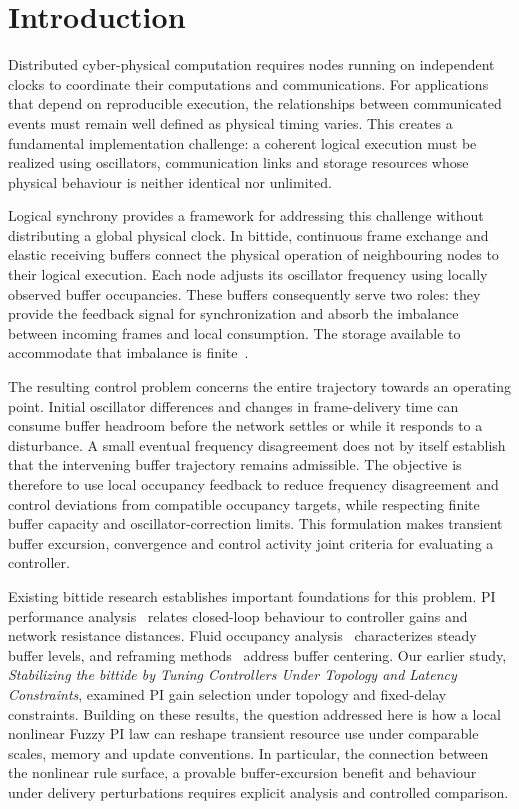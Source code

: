 \section{Introduction}
\label{sec:introduction}

Distributed cyber-physical computation requires nodes running on independent clocks to coordinate their computations and communications. For applications that depend on reproducible execution, the relationships between communicated events must remain well defined as physical timing varies. This creates a fundamental implementation challenge: a coherent logical execution must be realized using oscillators, communication links and storage resources whose physical behaviour is neither identical nor unlimited.

Logical synchrony provides a framework for addressing this challenge without distributing a global physical clock. In bittide, continuous frame exchange and elastic receiving buffers connect the physical operation of neighbouring nodes to their logical execution. Each node adjusts its oscillator frequency using locally observed buffer occupancies. These buffers consequently serve two roles: they provide the feedback signal for synchronization and absorb the imbalance between incoming frames and local consumption. The storage available to accommodate that imbalance is finite~\cite{lall2024logicalSynchrony}.

The resulting control problem concerns the entire trajectory towards an operating point. Initial oscillator differences and changes in frame-delivery time can consume buffer headroom before the network settles or while it responds to a disturbance. A small eventual frequency disagreement does not by itself establish that the intervening buffer trajectory remains admissible. The objective is therefore to use local occupancy feedback to reduce frequency disagreement and control deviations from compatible occupancy targets, while respecting finite buffer capacity and oscillator-correction limits. This formulation makes transient buffer excursion, convergence and control activity joint criteria for evaluating a controller.

Existing bittide research establishes important foundations for this problem. PI performance analysis~\cite{lall2022resistance} relates closed-loop behaviour to controller gains and network resistance distances. Fluid occupancy analysis~\cite{lall2024bufferOccupancy} characterizes steady buffer levels, and reframing methods~\cite{lall2023bufferCentering} address buffer centering. Our earlier study, \emph{Stabilizing the bittide by Tuning Controllers Under Topology and Latency Constraints}, examined PI gain selection under topology and fixed-delay constraints. Building on these results, the question addressed here is how a local nonlinear Fuzzy PI law can reshape transient resource use under comparable scales, memory and update conventions. In particular, the connection between the nonlinear rule surface, a provable buffer-excursion benefit and behaviour under delivery perturbations requires explicit analysis and controlled comparison.

